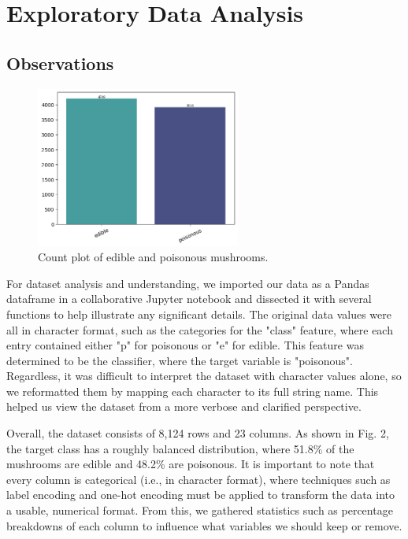 \documentclass[11pt, conference]{IEEEtran}
\begin{document}
\section{Exploratory Data Analysis}
    \subsection{Observations}
    \begin{figure}[htbp]
        \centering
        \includegraphics[width=0.6\textwidth]{plot/count/class count.png}
        \caption{Count plot of edible and poisonous mushrooms.}
        \label{fig:plot2}
    \end{figure}
    For dataset analysis and understanding, we imported our data as a Pandas dataframe in a collaborative Jupyter notebook and dissected it with several functions to help illustrate any significant details. The original data values were all in character format, such as the categories for the "class" feature, where each entry contained either "p" for poisonous or "e" for edible. This feature was determined to be the classifier, where the target variable is "poisonous". Regardless, it was difficult to interpret the dataset with character values alone, so we reformatted them by mapping each character to its full string name. This helped us view the dataset from a more verbose and clarified perspective.
   
    Overall, the dataset consists of 8,124 rows and 23 columns. As shown in Fig. 2, the target class has a roughly balanced distribution, where 51.8\% of the mushrooms are edible and 48.2\% are poisonous. It is important to note that every column is categorical (i.e., in character format), where techniques such as label encoding and one-hot encoding must be applied to transform the data into a usable, numerical format. From this, we gathered statistics such as percentage breakdowns of each column to influence what variables we should keep or remove.
\end{document}
